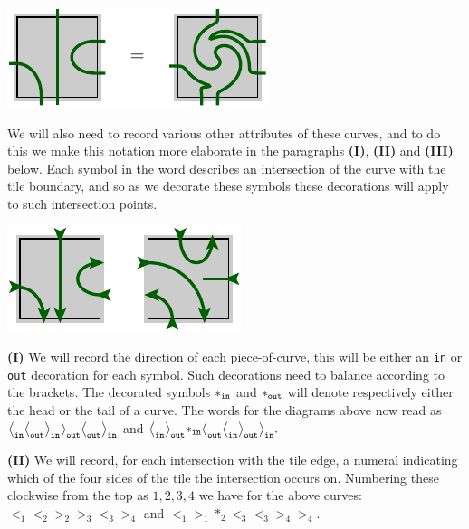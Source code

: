 \begin{center}
\includegraphics[]{pic-cells-0.pdf}
\end{center}

We will also need to record
various other attributes of these curves,
and to do this we make this notation more elaborate
in the paragraphs {\bf (I)}, {\bf(II)} and {\bf(III)} below.
Each symbol in the word describes an intersection of
the curve with the tile boundary,
and so as we decorate these symbols these decorations will
apply to such intersection points.

\begin{center}
\includegraphics[]{pic-cells-1.pdf}
\end{center}

{\bf (I)} We will record the direction of each piece-of-curve,
this will be either an {\tt in} or {\tt out} decoration for each symbol.
Such decorations need to balance according to the brackets.
The decorated symbols $*_{\mathrm{\tt in}}$ and 
$*_{\mathrm{\tt out}}$ 
will denote respectively either
the head or the tail of a curve.
The words for the diagrams above now read as
$ \bigl<_{\mathrm{\tt in}}\bigl<_{\mathrm{\tt out}}\bigr>_{\mathrm{\tt in}}
    \bigr>_{\mathrm{\tt out}}\bigl<_{\mathrm{\tt out}}\bigr>_{\mathrm{\tt in}}$
and
$ \bigl<_{\mathrm{\tt in}}\bigl>_{\mathrm{\tt out}}*_{\mathrm{\tt in}}
    \bigr<_{\mathrm{\tt out}}
    \bigr<_{\mathrm{\tt in}}\bigl>_{\mathrm{\tt out}}\bigr>_{\mathrm{\tt in}}.
$

\vskip 10pt
{\bf (II)} We will record,
for each intersection with the tile edge, 
a numeral indicating which of the four
sides of the tile the
intersection occurs on.
Numbering these clockwise from the top as $1, 2, 3, 4$ we have for the above curves: 
$\bigl<_1\bigl<_2\bigr>_2\bigr>_3\bigl<_3\bigr>_4$ 
and $\bigl<_1\bigr>_1*_2\bigl<_3\bigl<_3\bigr>_4\bigr>_4.$

